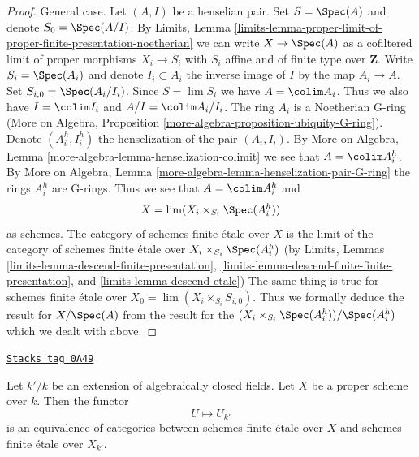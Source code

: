 \begin{proof}
\medskip\noindent
General case. Let $(A, I)$ be a henselian pair.
Set $S = \Spec(A)$ and denote $S_0 = \Spec(A/I)$. By Limits, Lemma
\ref{limits-lemma-proper-limit-of-proper-finite-presentation-noetherian}
we can write $X \to \Spec(A)$ as a cofiltered limit of
proper morphisms $X_i \to S_i$ with $S_i$ affine and of finite type
over $\mathbf{Z}$. Write $S_i = \Spec(A_i)$ and denote
$I_i \subset A_i$ the inverse image of $I$ by the map $A_i \to A$.
Set $S_{i, 0} = \Spec(A_i/I_i)$. Since $S = \lim S_i$ we have
$A = \colim A_i$. Thus we also have $I = \colim I_i$ and $A/I = \colim A_i/I_i$.
The ring $A_i$ is a Noetherian G-ring (More on Algebra, Proposition
\ref{more-algebra-proposition-ubiquity-G-ring}).
Denote $(A_i^h, I_i^h)$ the henselization of the pair $(A_i, I_i)$.
By More on Algebra, Lemma \ref{more-algebra-lemma-henselization-colimit}
we see that $A = \colim A_i^h$. By
More on Algebra, Lemma \ref{more-algebra-lemma-henselization-pair-G-ring}
the rings $A_i^h$ are G-rings. Thus we see that $A = \colim A_i^h$ and
$$
X = \lim (X_i \times_{S_i} \Spec(A_i^h))
$$
as schemes. The category of schemes finite \'etale over $X$ is the limit
of the category of schemes finite \'etale over
$X_i \times_{S_i} \Spec(A_i^h)$ (by
Limits, Lemmas
\ref{limits-lemma-descend-finite-presentation},
\ref{limits-lemma-descend-finite-finite-presentation}, and
\ref{limits-lemma-descend-etale})
The same thing is true for schemes finite \'etale over
$X_0 = \lim (X_i \times_{S_i} S_{i, 0})$.
Thus we formally deduce the result for $X / \Spec(A)$
from the result for the $(X_i \times_{S_i} \Spec(A_i^h)) / \Spec(A_i^h)$
which we dealt with above.
\end{proof}

\begin{lemma}
\label{pione-lemma-finite-etale-invariant-over-proper}
\href{https://stacks.math.columbia.edu/tag/0A49}{\texttt{Stacks tag 0A49}}

Let $k'/k$ be an extension of algebraically closed fields.
Let $X$ be a proper scheme over $k$. Then the functor
$$
U \longmapsto U_{k'}
$$
is an equivalence of categories between schemes finite \'etale over
$X$ and schemes finite \'etale over $X_{k'}$.
\end{lemma}

